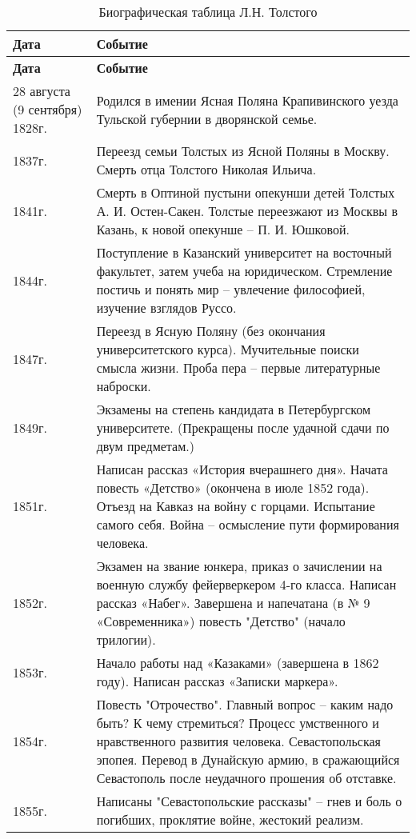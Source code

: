 \documentclass{article}
\begin{document}
\newpage

\begin{longtable}[c]{|p{3cm}|p{8cm}|}
  \caption{Биографическая таблица Л.Н. Толстого}\\
  \toprule
  \textbf{Дата} & \textbf{Событие}\\
  \hline
  \endfirsthead
  \toprule
  \textbf{Дата} & \textbf{Событие}\\
  \hline
  \endhead
  28 августа (9 сентября) 1828г. & Родился в имении Ясная Поляна Крапивинского
  уезда Тульской губернии в дворянской семье.\\
  \hline
  1837г. & Переезд семьи Толстых из Ясной Поляны в Москву. Смерть отца Толстого Николая Ильича.\\
  \hline
  1841г. & Смерть в Оптиной пустыни опекунши детей Толстых А. И. Остен-Сакен.
  Толстые переезжают из Москвы в Казань, к новой опекунше – П. И. Юшковой.\\
  \hline
  1844г. & Поступление в Казанский университет на восточный факультет, затем учеба на юридическом.
  Стремление постичь и понять мир – увлечение философией, изучение взглядов Руссо.\\
  \hline
  1847г. & Переезд в Ясную Поляну (без окончания университетского курса).
  Мучительные поиски смысла жизни. Проба пера – первые литературные наброски.\\
  \hline
  1849г. & Экзамены на степень кандидата в Петербургском университете.
  (Прекращены после удачной сдачи по двум предметам.)\\
  \hline
  1851г. & Написан рассказ «История вчерашнего дня». Начата повесть «Детство» (окончена в июле 1852 года).
  Отъезд на Кавказ на войну с горцами. Испытание самого себя. Война – осмысление пути формирования человека.\\
  \hline
  1852г. & Экзамен на звание юнкера, приказ о зачислении на военную службу фейерверкером 4-го класса.
  Написан рассказ «Набег». Завершена и напечатана (в № 9 «Современника») повесть "Детство" (начало трилогии).\\
  \hline
  1853г. & Начало работы над «Казаками» (завершена в 1862 году). Написан рассказ «Записки маркера».\\
  \hline
  1854г. & Повесть "Отрочество". Главный вопрос – каким надо быть? К чему стремиться?
  Процесс умственного и нравственного развития человека.
  Севастопольская эпопея. Перевод в Дунайскую армию, в сражающийся Севастополь
  после неудачного прошения об отставке.\\
  \hline
  1855г. & Написаны "Севастопольские рассказы" – гнев и боль о погибших, проклятие войне, жестокий реализм.\\

\end{longtable}
\end{document}
